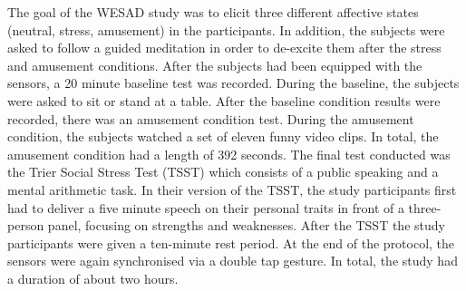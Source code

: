 The goal of the WESAD study was to elicit three different affective states (neutral, stress, amusement) in the participants. 
In addition, the subjects were asked to follow a guided meditation in order to de-excite them after the stress and amusement 
conditions. After the subjects had been equipped with the sensors, a 20 minute baseline test was recorded. During the baseline, 
the subjects were asked to sit or stand at a table. After the baseline condition results were recorded, there was an amusement 
condition test. During the amusement condition, the subjects watched a set of eleven funny video clips. In total, the amusement 
condition had a length of 392 seconds. The final test conducted was the Trier Social Stress Test (TSST) which consists of a public 
speaking and a mental arithmetic task. In their version of the TSST, the study participants first had to deliver a five minute 
speech on their personal traits in front of a three-person panel, focusing on strengths and weaknesses. After the TSST the study 
participants were given a ten-minute rest period. At the end of the protocol, the sensors were again synchronised via a double 
tap gesture. In total, the study had a duration of about two hours.
